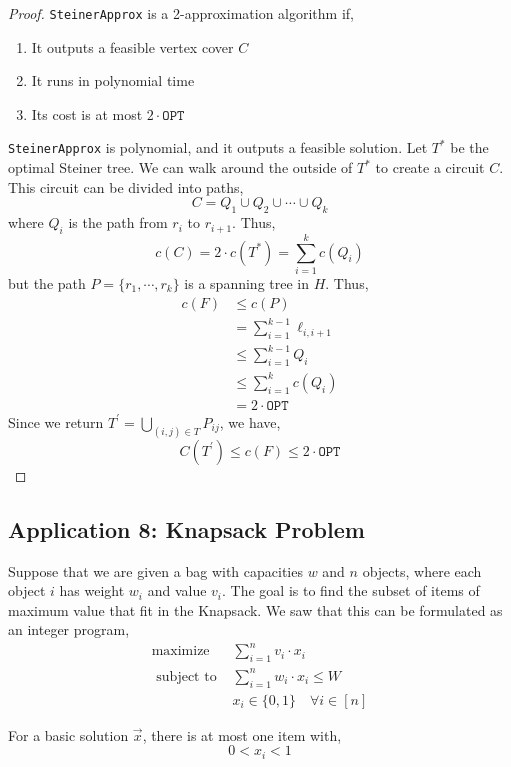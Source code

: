  \begin{proof}
 	\texttt{SteinerApprox} is a 2-approximation algorithm if,
	\begin{enumerate}
		\item It outputs a feasible vertex cover $C$
		\item It runs in polynomial time
		\item Its cost is at most $2 \cdot \texttt{OPT}$
	\end{enumerate}
	\noindent \texttt{SteinerApprox} is polynomial, and it outputs a feasible solution. Let $T^*$ be the optimal Steiner tree. We can walk around the outside of $T^*$ to create a circuit $C$. This circuit can be divided into paths,
	\[C = Q_1 \cup Q_2 \cup \cdots \cup Q_k\]
	\noindent where $Q_i$ is the path from $r_i$ to $r_{i+1}$. Thus,
	\[c(C) = 2 \cdot c(T^*) = \sum_{i=1}^k c(Q_i)\]
	\noindent but the path $P = \{r_1, \cdots, r_k\}$ is a spanning tree in $H$. Thus,
	\begin{align*}
		c(F) &\leq c(P) \\
			 &= \sum_{i=1}^{k-1} \ell_{i,i+1} \\
			 &\leq \sum_{i=1}^{k-1} Q_i \\
			 &\leq \sum_{i=1}^k c(Q_i) \\
			 &= 2 \cdot \texttt{OPT}
	\end{align*}
	\noindent Since we return $T^{\prime} = \bigcup_{(i,j) \in T} P_{ij}$, we have,
	\[C(T^{\prime}) \leq c(F) \leq 2 \cdot \texttt{OPT}\]
 \end{proof}

\subsection{Application 8: Knapsack Problem}
Suppose that we are given a bag with capacities $w$ and $n$ objects, where each object $i$ has weight $w_i$ and value $v_i$. The goal is to find the subset of items of maximum value that fit in the Knapsack. We saw that this can be formulated as an integer program,
\[\begin{array}{ll}
		\operatorname{maximize} & \sum_{i=1}^{n} v_{i} \cdot x_{i} \\
		\text{ subject to } & \sum_{i=1}^{n} w_{i} \cdot x_{i} \leq W \\
		& x_{i} \in\{0,1\} \quad \forall i \in[n]
\end{array}\]

\begin{lem}
	For a basic solution $\Vec{x}$, there is at most one item with,
	\[0 < x_i < 1\]
\end{lem}

